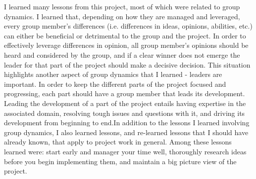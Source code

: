 I learned many lessons from this project, most of which were related to group dynamics. I learned that, depending on how they are managed and leveraged, every group member's differences (i.e. differences in ideas, opinions, abilities, etc.) can either be beneficial or detrimental to the group and the project. In order to effectively leverage differences in opinion, all group member's opinions should be heard and considered by the group, and if a clear winner does not emerge the leader for that part of the project should make a decisive decision. This situation highlights another aspect of group dynamics that I learned - leaders are important. In order to keep the different parts of the project focused and progressing, each part should have a group member that leads its development. Leading the development of a part of the project entails having expertise in the associated domain, resolving tough issues and questions with it, and driving its development from beginning to end.In addition to the lessons I learned involving group dynamics, I also learned lessons, and re-learned lessons that I should have already known, that apply to project work in general. Among these lessons learned were: start early and manager your time well, thoroughly research ideas before you begin implementing them, and maintain a big picture view of the project.